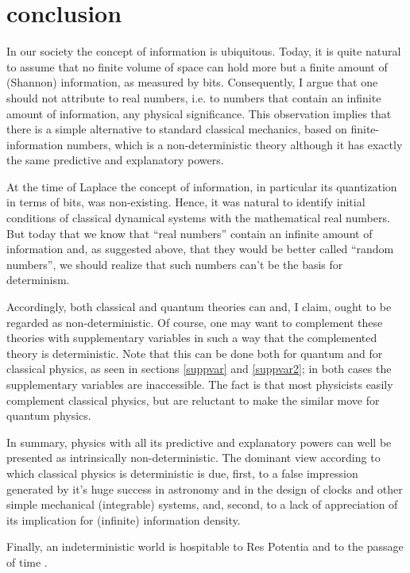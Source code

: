 \documentclass[floatfix,12pt]{article}
\begin{document}
\section{conclusion}
In our society the concept of information is ubiquitous. Today, it is quite natural to assume that no finite volume of space can hold more but a finite amount of (Shannon) information, as measured by bits. Consequently, I argue that one should not attribute to real numbers, i.e. to numbers that contain an infinite amount of information, any physical significance. This observation implies that there is a simple alternative to standard classical mechanics, based on finite-information numbers, which is a non-deterministic theory although it has exactly the same predictive and explanatory powers.

At the time of Laplace the concept of information, in particular its quantization in terms of bits, was non-existing. Hence, it was natural to identify initial conditions of classical dynamical systems with the mathematical real numbers. But today that we know that ``real numbers'' contain an infinite amount of information and, as suggested above, that they would be better called ``random numbers'', we should realize that such numbers can't be the basis for determinism.

Accordingly, both classical and quantum theories can and, I claim, ought to be regarded as non-deterministic. Of course, one may want to complement these theories with supplementary variables in such a way that the complemented theory is deterministic. Note that this can be done both for quantum and for classical physics, as seen in sections \ref{suppvar} and \ref{suppvar2}; in both cases the supplementary variables are inaccessible. The fact is that most physicists easily complement classical physics, but are reluctant to make the similar move for quantum physics. 

In summary, physics with all its predictive and explanatory powers can well be presented as intrinsically non-deterministic. The dominant view according to which classical physics is deterministic is due, first, to a false impression generated by it's huge success in astronomy and in the design of clocks and other simple mechanical (integrable) systems, and, second, to a lack of appreciation of its implication for (infinite) information density. 

Finally, an indeterministic world is hospitable to Res Potentia and to the passage of time \cite{GisinTimePasses,past,DolevPassage}. \\
\end{document}
